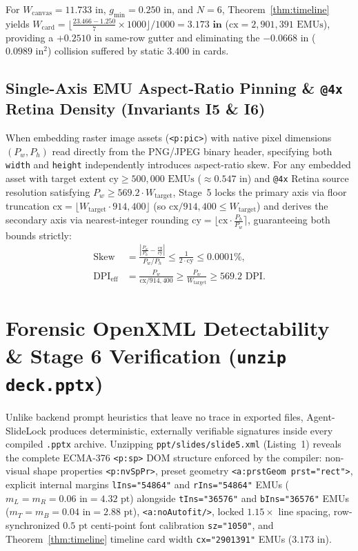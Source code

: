 \documentclass[10pt,journal,compsoc]{IEEEtran}
\begin{document}
For $W_{\text{canvas}} = 11.733\text{ in}$, $g_{\min} = 0.250\text{ in}$, and $N = 6$, Theorem~\ref{thm:timeline} yields $W_{\text{card}} = \lfloor \frac{23.466 - 1.250}{7} \times 1000 \rfloor / 1000 = \mathbf{3.173\text{ in}}$ ($\text{cx} = 2{,}901{,}391\text{ EMUs}$), providing a $+0.2510\text{ in}$ same-row gutter and eliminating the $-0.0668\text{ in}$ ($0.0989\text{ in}^2$) collision suffered by static $3.400\text{ in}$ cards.

\subsection{Single-Axis EMU Aspect-Ratio Pinning \& \texttt{@4x} Retina Density (Invariants I5 \& I6)}
When embedding raster image assets (\texttt{<p:pic>}) with native pixel dimensions $(P_w, P_h)$ read directly from the PNG/JPEG binary header, specifying both \texttt{width} and \texttt{height} independently introduces aspect-ratio skew. For any embedded asset with target extent $\text{cy} \ge 500{,}000\text{ EMUs}$ ($\approx 0.547\text{ in}$) and \texttt{@4x} Retina source resolution satisfying $P_w \ge 569.2 \cdot W_{\text{target}}$, Stage~5 locks the primary axis via floor truncation $\text{cx} = \lfloor W_{\text{target}} \cdot 914{,}400 \rfloor$ (so $\text{cx} / 914{,}400 \le W_{\text{target}}$) and derives the secondary axis via nearest-integer rounding $\text{cy} = \lfloor \text{cx} \cdot \frac{P_h}{P_w} \rceil$, guaranteeing both bounds strictly:
\begin{align}
    \text{Skew} &= \frac{\left|\frac{P_w}{P_h} - \frac{\text{cx}}{\text{cy}}\right|}{P_w / P_h} \le \frac{1}{2 \cdot \text{cy}} \le 0.0001\%, \label{eq:skew} \\
    \text{DPI}_{\text{eff}} &= \frac{P_w}{\text{cx} / 914{,}400} \ge \frac{P_w}{W_{\text{target}}} \ge 569.2\text{ DPI}. \label{eq:dpi}
\end{align}

\section{Forensic OpenXML Detectability \& Stage 6 Verification (\texttt{unzip deck.pptx})}
\label{sec:detectability}

Unlike backend prompt heuristics that leave no trace in exported files, Agent-SlideLock produces deterministic, externally verifiable signatures inside every compiled \texttt{.pptx} archive. Unzipping \texttt{ppt/slides/slide5.xml} (Listing~1) reveals the complete ECMA-376 \texttt{<p:sp>} DOM structure enforced by the compiler: non-visual shape properties \texttt{<p:nvSpPr>}, preset geometry \texttt{<a:prstGeom prst="rect">}, explicit internal margins \texttt{lIns="54864"} and \texttt{rIns="54864"} EMUs ($m_L = m_R = 0.06\text{ in} = 4.32\text{ pt}$) alongside \texttt{tIns="36576"} and \texttt{bIns="36576"} EMUs ($m_T = m_B = 0.04\text{ in} = 2.88\text{ pt}$), \texttt{<a:noAutofit/>}, locked $1.15\times$ line spacing, row-synchronized $0.5\text{ pt}$ centi-point font calibration \texttt{sz="1050"}, and Theorem~\ref{thm:timeline} timeline card width \texttt{cx="2901391"} EMUs ($3.173\text{ in}$).
\end{document}
